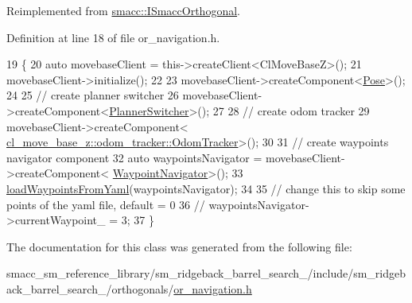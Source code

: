 Reimplemented from \hyperlink{classsmacc_1_1ISmaccOrthogonal_a6bb31c620cb64dd7b8417f8705c79c7a}{smacc\+::\+I\+Smacc\+Orthogonal}.



Definition at line 18 of file or\+\_\+navigation.\+h.


\begin{DoxyCode}
19         \{
20             \textcolor{keyword}{auto} movebaseClient = this->createClient<ClMoveBaseZ>();
21             movebaseClient->initialize();
22 
23             movebaseClient->createComponent<\hyperlink{classcl__move__base__z_1_1Pose}{Pose}>();
24 
25             \textcolor{comment}{// create planner switcher}
26             movebaseClient->createComponent<\hyperlink{classcl__move__base__z_1_1PlannerSwitcher}{PlannerSwitcher}>();
27 
28             \textcolor{comment}{// create odom tracker}
29             movebaseClient->createComponent<
      \hyperlink{classcl__move__base__z_1_1odom__tracker_1_1OdomTracker}{cl\_move\_base\_z::odom\_tracker::OdomTracker}>();
30 
31             \textcolor{comment}{// create waypoints navigator component}
32             \textcolor{keyword}{auto} waypointsNavigator = movebaseClient->createComponent<
      \hyperlink{classcl__move__base__z_1_1WaypointNavigator}{WaypointNavigator}>();
33             \hyperlink{classsm__ridgeback__barrel__search__1_1_1OrNavigation_a875df5d1fdcd34f568e6db573dfbaed7}{loadWaypointsFromYaml}(waypointsNavigator);
34 
35             \textcolor{comment}{// change this to skip some points of the yaml file, default = 0}
36             \textcolor{comment}{// waypointsNavigator->currentWaypoint\_ = 3;}
37         \}
\end{DoxyCode}


The documentation for this class was generated from the following file\+:\begin{DoxyCompactItemize}
\item 
smacc\+\_\+sm\+\_\+reference\+\_\+library/sm\+\_\+ridgeback\+\_\+barrel\+\_\+search\+\_/include/sm\+\_\+ridgeback\+\_\+barrel\+\_\+search\+\_/orthogonals/\hyperlink{sm__ridgeback__barrel__search__1_2include_2sm__ridgeback__barrel__search__1_2orthogonals_2or__navigation_8h}{or\+\_\+navigation.\+h}\end{DoxyCompactItemize}
